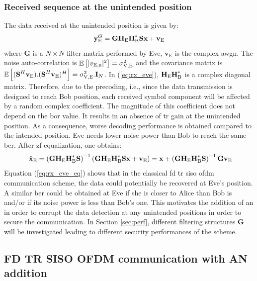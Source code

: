 \subsubsection{Received sequence at the unintended position}
The data received at the unintended position is given by:
\begin{equation}
    \textbf{y}_{\text{E}}^G= \textbf{G}\textbf{H}_{\text{E}} \textbf{H}_{\text{B}}^* \textbf{S} \textbf{x}  +  \textbf{v}_\text{E}
    \label{eq:rx_eve}
\end{equation}
where $\textbf{G}$ is a $N \times N$ filter matrix performed by Eve, $\textbf{v}_\text{E}$ is the complex \gls{awgn}. The noise auto-correlation is $\mathbb{E} \left[|v_{\text{E,n}}|^2\right] = \sigma_{\text{V,E}}^2$ and the covariance matrix is $\mathbb{E} \left[(\textbf{S}^H  \textbf{v}_\text{E}) . (\textbf{S}^H \textbf{v}_\text{E})^H\right] = \sigma_{\text{V,E}}^2 . \textbf{I}_N$.  In (\ref{eq:rx_eve}), $\textbf{H}_{\text{E}} \textbf{H}_{\text{B}}^*$ is a complex diagonal matrix. Therefore, due to the precoding, i.e., since the data transmission is designed to reach Bob position, each received symbol component will be affected by a random complex coefficient. The magnitude of this coefficient does not depend on the \gls{bor} value. It results in an absence of \gls{tr} gain at the unintended position. As a consequence, worse decoding performance is obtained compared to the intended position. Eve needs lower noise power than Bob to reach the same \gls{ber}. After \gls{zf} equalization, one obtains:
\begin{equation}\
    \hat{\textbf{x}}_{\text{E}} = \left(\textbf{G}  \textbf{H}_{\text{E}} \textbf{H}_{\text{B}}^*\textbf{S}\right)^{-1} \left(\textbf{G}\textbf{H}_{\text{E}} \textbf{H}_{\text{B}}^* \textbf{S} \textbf{x}  +  \textbf{v}_\text{E}\right) = \textbf{x} +  \left(\textbf{G}  \textbf{H}_{\text{E}} \textbf{H}_{\text{B}}^*\textbf{S}\right)^{-1}\textbf{G}\textbf{v}_\text{E}
    \label{eq:rx_eve_eq}
\end{equation}
Equation (\ref{eq:rx_eve_eq}) shows that in the classical \gls{fd} \gls{tr} \gls{siso} \gls{ofdm} communication scheme, the data could potentially be recovered at Eve's position. A similar \gls{ber} could be obtained at Eve if she is closer to Alice than Bob is and/or if its noise power is less than Bob's one. This motivates the addition of \gls{an} in order to corrupt the data detection at any unintended positions in order to secure the communication. In Section \ref{sec:perf}, different filtering structures $\textbf{G}$ will be investigated leading to different security performances of the scheme.

\subsection{FD TR SISO OFDM communication with AN addition}

